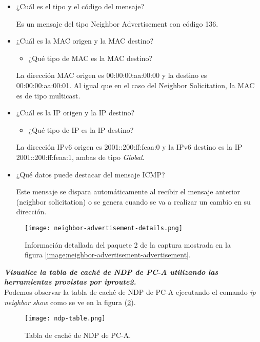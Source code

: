 \documentclass[osajnl,twocolumn,showpacs,superscriptaddress,10pt]{revtex4-1} %
\begin{document}
\begin{itemize}
    \item ¿Cuál es el tipo y el código del mensaje?
    
    Es un mensaje del tipo Neighbor Advertisement con código 136.

    \item ¿Cuál es la MAC origen y la MAC destino?
    
    
    \begin{itemize}
        \item ¿Qué tipo de MAC es la MAC destino?
    \end{itemize}

    La dirección MAC origen es 00:00:00:aa:00:00 y la destino es 00:00:00:aa:00:01.
    Al igual que en el caso del Neighbor Solicitation, la MAC es de tipo multicast.
    
    \item ¿Cuál es la IP origen y la IP destino?
    
    \begin{itemize}
        \item ¿Qué tipo de IP es la IP destino?
    \end{itemize}

    La dirección IPv6 origen es 2001::200:ff:feaa:0 y la IPv6 destino es la IP 2001::200:ff:feaa:1, ambas de tipo \textit{Global}.
    
    \item ¿Qué datos puede destacar del mensaje ICMP?

    Este mensaje se dispara automáticamente al recibir el mensaje anterior (neighbor solicitation) o se genera cuando se va a realizar un cambio en su dirección.
\end{itemize}

\begin{figure}[H]
    \centering
    \texttt{[image: neighbor-advertisement-details.png]}
    \caption{Información detallada del paquete 2 de la captura mostrada en la figura \ref{image:neighbor-advertisement-advertisement}.}
    \label{image:neighbor-advertisement-details}
\end{figure}

\textit{\textbf{Visualice la tabla de caché de NDP de PC-A utilizando las herramientas provistas por
iproute2.}} \\

Podemos observar la tabla de caché de NDP de PC-A ejecutando el comando \textit{ip neighbor show} como se ve
en la figura (\ref{image:ndp-table}).

\begin{figure}[H]
    \centering
    \texttt{[image: ndp-table.png]}
    \caption{Tabla de caché de NDP de PC-A.}
    \label{image:ndp-table}
\end{figure}
\end{document}
